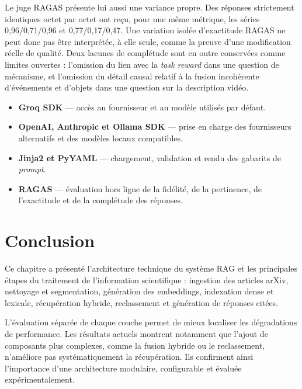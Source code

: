 Le juge RAGAS présente lui aussi une variance propre. Des réponses strictement
identiques octet par octet ont reçu, pour une même métrique, les séries
0,96/0,71/0,96 et 0,77/0,17/0,47. Une variation isolée d'exactitude RAGAS ne peut
donc pas être interprétée, à elle seule, comme la preuve d'une modification réelle
de qualité. Deux lacunes de complétude sont en outre conservées comme limites
ouvertes : l'omission du lien avec la \emph{task reward} dans une question de
mécanisme, et l'omission du détail causal relatif à la fusion incohérente
d'événements et d'objets dans une question sur la description vidéo.

\begin{encadre}
\begin{itemize}
  \item \textbf{Groq SDK} — accès au fournisseur et au modèle utilisés par défaut.
  \item \textbf{OpenAI, Anthropic et Ollama SDK} — prise en charge des fournisseurs
        alternatifs et des modèles locaux compatibles.
  \item \textbf{Jinja2 et PyYAML} — chargement, validation et rendu des gabarits de
        \emph{prompt}.
  \item \textbf{RAGAS} — évaluation hors ligne de la fidélité, de la pertinence, de
        l'exactitude et de la complétude des réponses.
\end{itemize}
\end{encadre}

\section*{Conclusion}

Ce chapitre a présenté l'architecture technique du système RAG et les principales
étapes du traitement de l'information scientifique : ingestion des articles arXiv,
nettoyage et segmentation, génération des embeddings, indexation dense et lexicale,
récupération hybride, reclassement et génération de réponses citées.

L'évaluation séparée de chaque couche permet de mieux localiser les dégradations de
performance. Les résultats actuels montrent notamment que l'ajout de composants plus
complexes, comme la fusion hybride ou le reclassement, n'améliore pas
systématiquement la récupération. Ils confirment ainsi l'importance d'une architecture
modulaire, configurable et évaluée expérimentalement.

